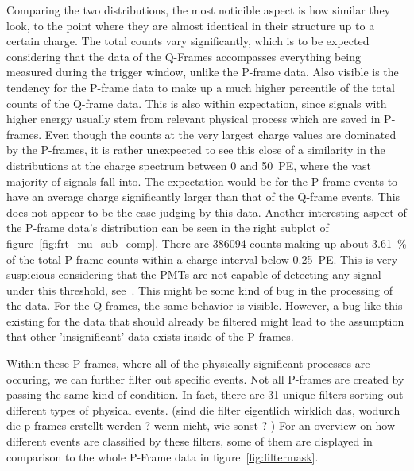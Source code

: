 Comparing the two distributions, the most noticible aspect is how similar they look, to the point where they are almost identical in their structure up to a 
certain charge. The total counts vary significantly, which is to be expected considering that the data of the Q-Frames accompasses everything being measured during the 
trigger window, unlike the P-frame data. Also visible is the tendency for the P-frame data to make up a much higher percentile of the total counts of the Q-frame data.
This is also within 
expectation, since signals with higher energy usually stem from relevant physical process which are saved in P-frames. Even though the counts at the very largest 
charge values are dominated by the P-frames, it is rather unexpected to see this close of a similarity in the distributions at the charge spectrum between
\num{0} and \num{50}~\unit{PE}, where the vast majority of signals fall into. The expectation would be for the P-frame events to have an average charge significantly
larger than that of the Q-frame events. This does not appear to be the case judging by this data. Another interesting aspect of the P-frame data's distribution can be 
seen in the right subplot of figure~\ref{fig:frt_mu_sub_comp}. There are \num{386094} counts making up about \SI{3.61}{\percent} of the total P-frame counts within 
a charge interval below \num{0.25}~\unit{PE}. This is very suspicious considering that the PMTs are not capable of detecting any signal under this threshold,
see~\cite{einstein}. This might be some kind of bug in the processing of the data. For the Q-frames, the same behavior is visible. However, a bug like this 
existing for the data that should already be filtered might lead to the assumption that other 'insignificant' data exists inside of the P-frames. 


Within these P-frames, where all of the physically significant processes are occuring, we can further filter out specific events. Not all P-frames are created by 
passing the same kind of condition. In fact, there are \num{31} unique filters sorting out different types of physical events. (sind die filter eigentlich wirklich 
das, wodurch die p frames erstellt werden ? wenn nicht, wie sonst ? )
For an overview on how different events are classified by these filters, some of them are displayed in comparison to the whole P-Frame data in 
figure~\ref{fig:filtermask}. 

